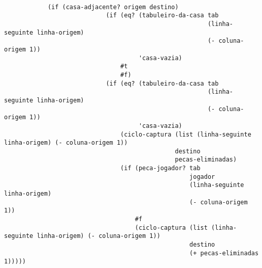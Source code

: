             \begin{lstlisting}[basicstyle=\ttfamily, caption="example"]

            (if (casa-adjacente? origem destino)
                            (if (eq? (tabuleiro-da-casa tab
                                                        (linha-seguinte linha-origem)
                                                        (- coluna-origem 1))
                                     'casa-vazia)
                                #t
                                #f)
                            (if (eq? (tabuleiro-da-casa tab
                                                        (linha-seguinte linha-origem)
                                                        (- coluna-origem 1))
                                     'casa-vazia)
                                (ciclo-captura (list (linha-seguinte linha-origem) (- coluna-origem 1))
                                               destino
                                               pecas-eliminadas)
                                (if (peca-jogador? tab
                                                   jogador
                                                   (linha-seguinte linha-origem)
                                                   (- coluna-origem 1))
                                    #f
                                    (ciclo-captura (list (linha-seguinte linha-origem) (- coluna-origem 1))
                                                   destino
                                                   (+ pecas-eliminadas 1)))))
                                                 \end{lstlisting}
